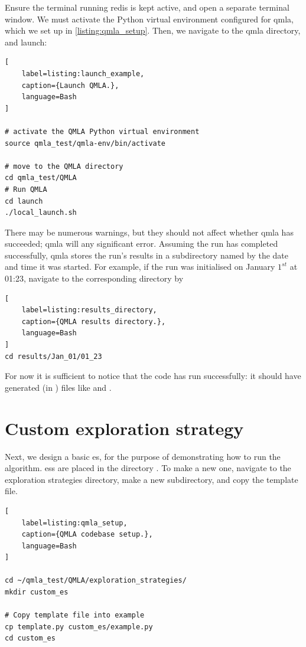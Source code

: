 Ensure the terminal running redis is kept active, and open a separate terminal window. 
We must activate the Python virtual environment configured for \gls{qmla}, 
which we set up in \cref{listing:qmla_setup}. 
Then, we navigate to the \gls{qmla} directory, and launch:
\begin{lstlisting}[
    label=listing:launch_example,
    caption={Launch QMLA.},
    language=Bash
]

# activate the QMLA Python virtual environment 
source qmla_test/qmla-env/bin/activate

# move to the QMLA directory 
cd qmla_test/QMLA
# Run QMLA
cd launch   
./local_launch.sh

\end{lstlisting}

There may be numerous warnings, but they should not affect whether \gls{qmla} has succeeded; 
    \gls{qmla} will  any significant error. 
Assuming the \gls{run} has completed successfully, \gls{qmla} stores the run's results in a subdirectory
    named by the date and time it was started.  
For example, if the \gls{run} was initialised on January $1^{st}$ at 01:23, navigate to the corresponding directory by

\begin{lstlisting}[
    label=listing:results_directory,
    caption={QMLA results directory.},
    language=Bash
]
cd results/Jan_01/01_23
\end{lstlisting}

For now it is sufficient to notice that the code has \gls{run} successfully:
    it should have generated (in ) files like  and .

\section{Custom exploration strategy}

Next, we design a basic \gls{es}, for the purpose of demonstrating how to \gls{run} the algorithm.
\glspl{es} are placed in the directory . 
To make a new one, navigate to the exploration strategies directory, 
make a new subdirectory, and copy the template file. 

\begin{lstlisting}[
    label=listing:qmla_setup,
    caption={QMLA codebase setup.},
    language=Bash
]

cd ~/qmla_test/QMLA/exploration_strategies/
mkdir custom_es

# Copy template file into example
cp template.py custom_es/example.py
cd custom_es

\end{lstlisting}

